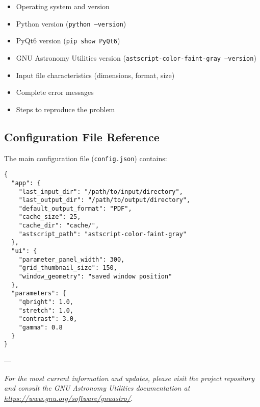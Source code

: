 \documentclass[11pt,a4paper]{article}
\begin{document}
\begin{itemize}[leftmargin=*]
\item Operating system and version
\item Python version (\texttt{python --version})
\item PyQt6 version (\texttt{pip show PyQt6})
\item GNU Astronomy Utilities version (\texttt{astscript-color-faint-gray
--version})
\item Input file characteristics (dimensions, format, size)
\item Complete error messages
\item Steps to reproduce the problem
\end{itemize}

\subsection{Configuration File Reference}

The main configuration file (\texttt{config.json}) contains:

\begin{lstlisting}
{
  "app": {
    "last_input_dir": "/path/to/input/directory",
    "last_output_dir": "/path/to/output/directory", 
    "default_output_format": "PDF",
    "cache_size": 25,
    "cache_dir": "cache/",
    "astscript_path": "astscript-color-faint-gray"
  },
  "ui": {
    "parameter_panel_width": 300,
    "grid_thumbnail_size": 150,
    "window_geometry": "saved window position"
  },
  "parameters": {
    "qbright": 1.0,
    "stretch": 1.0,
    "contrast": 3.0,
    "gamma": 0.8
  }
}
\end{lstlisting}

---

\textit{For the most current information and updates, please visit the
project repository and consult the GNU Astronomy Utilities documentation at
\url{https://www.gnu.org/software/gnuastro/}.}
\end{document}
